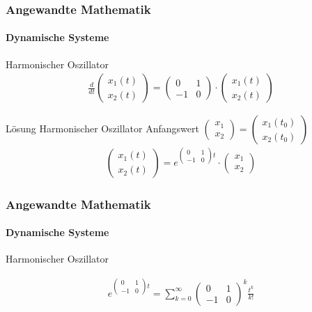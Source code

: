 \documentclass{beamer}
\begin{document}
\begin{frame}
    \frametitle{Angewandte Mathematik}
\framesubtitle{Dynamische Systeme }
\begin{block}{Harmonischer Oszillator}
\begin{align*}
    \frac{d}{dt}\begin{pmatrix}
        x_1(t) \\ x_2(t)
    \end{pmatrix} = 
\begin{pmatrix}
    0 & 1  \\ -1 & 0
\end{pmatrix} \cdot
\begin{pmatrix} 
    x_1(t) \\ x_2(t)
\end{pmatrix} 
\end{align*}
\end{block}

\begin{block}{Lösung Harmonischer Oszillator}
    Anfangswert $\begin{pmatrix}
        x_1 \\ x_2\end{pmatrix} = \begin{pmatrix}
            x_1(t_0) \\ x_2(t_0)\end{pmatrix}$
    \begin{align*}
        \begin{pmatrix}
            x_1(t) \\ x_2(t)
        \end{pmatrix} = e^{ \begin{pmatrix}
            0 & 1  \\ -1 & 0
        \end{pmatrix} t } \cdot \begin{pmatrix}
            x_1\\ x_2
        \end{pmatrix}
    \end{align*}
\end{block}

 \end{frame}


 \begin{frame}
    \frametitle{Angewandte Mathematik}
\framesubtitle{Dynamische Systeme }
\begin{block}{Harmonischer Oszillator}

\begin{align*}
 e^{ \begin{pmatrix}
        0 & 1  \\ -1 & 0
    \end{pmatrix} t } = \sum_{k= 0}^{\infty} \begin{pmatrix}
    0 & 1  \\ -1 & 0
\end{pmatrix}^{k} \frac{t^k}{k!} 
\end{align*}

\end{block}
 \end{frame}
\end{document}
